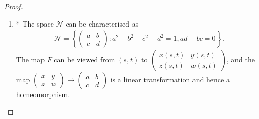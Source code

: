 \documentclass[11pt]{article}
\theoremstyle{definition}
\numberwithin{equation}{subsection}
\begin{document}
\begin{proof}
\begin{enumerate}[label=(\alph*)]
    \item* The space $\mathcal{N}$ can be characterised as
    \begin{align*}
        \mathcal{N} = \left\{ \begin{pmatrix}
            a & b \\ 
            c & d
        \end{pmatrix}: a^2 + b^2 + c^2 + d^2=1, ad-bc = 0\right\}.
    \end{align*}
    The map $F$ can be viewed from $(s,t)$ to $\begin{pmatrix}
        x(s,t) & y(s,t) \\ 
        z(s,t) & w(s,t)
    \end{pmatrix}$, and the map $\begin{pmatrix}
        x & y\\ 
        z & w
    \end{pmatrix} \to \begin{pmatrix}
        a & b \\ 
        c & d
    \end{pmatrix}$ is a linear transformation and hence a homeomorphism\cite{6}.
\end{enumerate}
\end{proof}

\medskip
\end{document}

